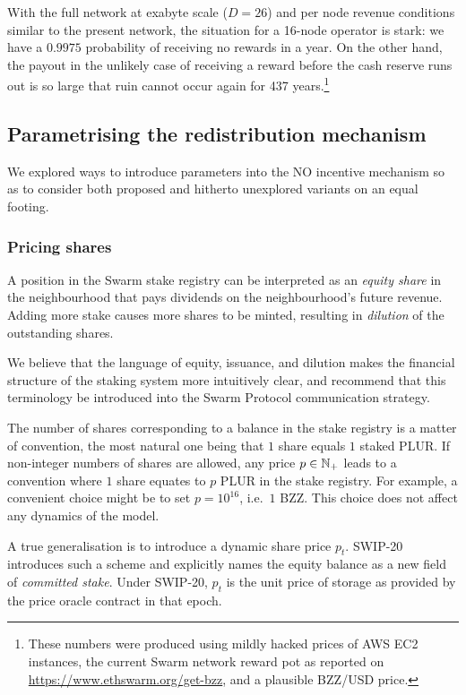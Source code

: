 With the full network at exabyte scale ($D=26$) and per node revenue conditions similar to the present network, the situation for a 16-node operator is stark: we have a $0.9975$ probability of receiving no rewards in a year.
%
On the other hand, the payout in the unlikely case of receiving a reward before the cash reserve runs out is so large that ruin cannot occur again for 437 years.\footnote{These numbers were produced using mildly hacked prices of AWS EC2 instances, the current Swarm network reward pot as reported on \url{https://www.ethswarm.org/get-bzz}, and a plausible BZZ/USD price.}

\subsection*{Parametrising the redistribution mechanism}

We explored ways to introduce parameters into the NO incentive mechanism so as to consider both proposed and hitherto unexplored variants on an equal footing.

\subsubsection*{Pricing shares}

A position in the Swarm stake registry can be interpreted as an \emph{equity share} in the neighbourhood that pays dividends on the neighbourhood's future revenue.
%
Adding more stake causes more shares to be minted, resulting in \emph{dilution} of the outstanding shares.

We believe that the language of equity, issuance, and dilution makes the financial structure of the staking system more intuitively clear, and recommend that this terminology be introduced into the Swarm Protocol communication strategy.

The number of shares corresponding to a balance in the stake registry is a matter of convention, the most natural one being that $1$ share equals $1$ staked PLUR.
%
If non-integer numbers of shares are allowed, any price $p\in\mathbb{N}_+$ leads to a convention where $1$ share equates to $p$ PLUR in the stake registry.
%
For example, a convenient choice might be to set $p=10^{16}$, i.e.~$1$ BZZ.
%
This choice does not affect any dynamics of the model.

A true generalisation is to introduce a dynamic share price $p_t$.
%
SWIP-20 introduces such a scheme and explicitly names the equity balance as a new field of \emph{committed stake}.
%
Under SWIP-20, $p_t$ is the unit price of storage as provided by the price oracle contract in that epoch.

